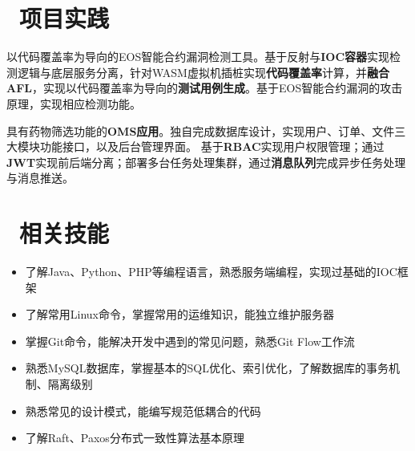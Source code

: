 \documentclass{resume}
\begin{document}


  \section{\faUsers\ 项目实践}

  \begin{onehalfspacing}
    以代码覆盖率为导向的EOS智能合约漏洞检测工具。基于反射与\textbf{IOC容器}实现检测逻辑与底层服务分离，针对WASM虚拟机插桩实现\textbf{代码覆盖率}计算，并\textbf{融合AFL}，实现以代码覆盖率为导向的\textbf{测试用例生成}。基于EOS智能合约漏洞的攻击原理，实现相应检测功能。
  \end{onehalfspacing}


  \begin{onehalfspacing}
    具有药物筛选功能的\textbf{OMS应用}。独自完成数据库设计，实现用户、订单、文件三大模块功能接口，以及后台管理界面。
    基于\textbf{RBAC}实现用户权限管理；通过\textbf{JWT}实现前后端分离；部署多台任务处理集群，通过\textbf{消息队列}完成异步任务处理与消息推送。
  \end{onehalfspacing}

  \section{\faInfo\ 相关技能}

  \begin{onehalfspacing}
    \begin{itemize}
      \item 了解Java、Python、PHP等编程语言，熟悉服务端编程，实现过基础的IOC框架
      \item 了解常用Linux命令，掌握常用的运维知识，能独立维护服务器
      \item 掌握Git命令，能解决开发中遇到的常见问题，熟悉Git Flow工作流
      \item 熟悉MySQL数据库，掌握基本的SQL优化、索引优化，了解数据库的事务机制、隔离级别
      \item 熟悉常见的设计模式，能编写规范低耦合的代码
      \item 了解Raft、Paxos分布式一致性算法基本原理
    \end{itemize}
  \end{onehalfspacing}
\end{document}

